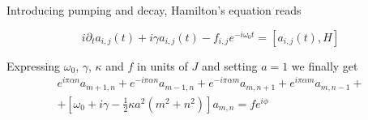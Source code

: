 \documentclass[a4paper,prb,10pt,aps,twocolumn]{revtex4-1}
\begin{document}



Introducing pumping and decay, Hamilton's equation reads

\begin{equation}
  \label{eq:6}
i\partial_{t}a_{i,j}(t)+i\gamma a_{i,j}(t)-f_{i,j}e^{-i\omega_{0}t}=\left[a_{i,j}(t),H\right]  
\end{equation}






Expressing $\omega_{0}$, $\gamma$, $\kappa$ and $f$ in units of $J$ and setting $a=1$ we finally get
\begin{multline}
  \label{eq:12}
e^{i\pi\alpha n}a_{m+1,n}+e^{-i\pi\alpha n}a_{m-1,n}+e^{-i\pi\alpha m}a_{m,n+1}+e^{i\pi\alpha m}a_{m,n-1}+\\+\left[\omega_{0}+i\gamma-\frac{1}{2}\kappa a^{2}(m^{2}+n^{2})\right]a_{m,n}=fe^{i\phi}  
\end{multline}
\end{document}
